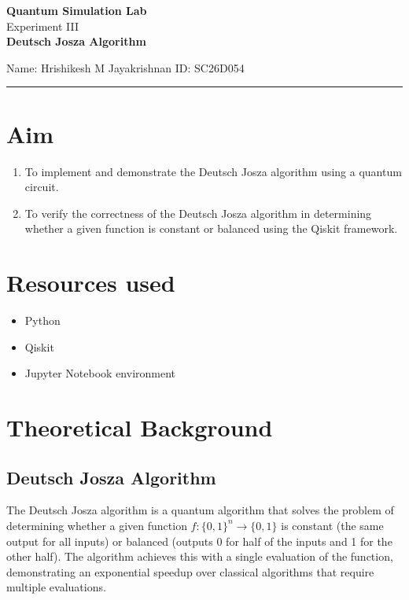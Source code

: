\documentclass[12pt]{article}
\begin{document}
\begin{center}
    {\Large \textbf{Quantum Simulation Lab}} \\
    \vspace{0.8cm}
    {\Large Experiment III} \\
    \vspace{0.2cm}
    {\Large \textbf{Deutsch Josza Algorithm}} \\
\end{center}

\vspace{0.5cm}
\noindent Name: Hrishikesh M Jayakrishnan \hfill ID: SC26D054
\vspace{1em}
\hrule

\vspace{1em}
\section{Aim}
\begin{enumerate}
    \item To implement and demonstrate the Deutsch Josza algorithm using a quantum circuit.
    \item To verify the correctness of the Deutsch Josza algorithm in determining whether a given function is constant or balanced using the Qiskit framework.
\end{enumerate}
\section{Resources used}
\begin{itemize}
    \item Python
    \item Qiskit 
    \item Jupyter Notebook environment
\end{itemize}

\section{Theoretical Background}
\subsection{Deutsch Josza Algorithm}
The Deutsch Josza algorithm is a quantum algorithm that solves the problem of determining whether a given function \( f: \{0, 1\}^n \rightarrow \{0, 1\} \) is constant (the same output for all inputs) or balanced (outputs 0 for half of the inputs and 1 for the other half). The algorithm achieves this with a single evaluation of the function, demonstrating an exponential speedup over classical algorithms that require multiple evaluations.
\newpage
\end{document}
